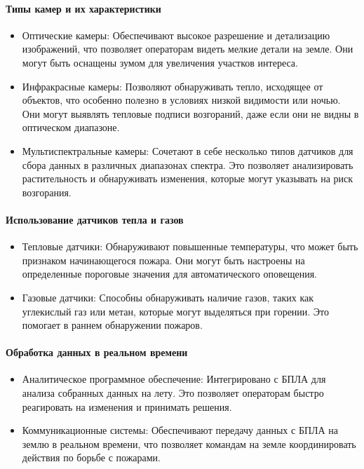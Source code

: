 \paragraph{Типы камер и их характеристики}
\begin{itemize}
	\item Оптические камеры: Обеспечивают высокое разрешение и детализацию изображений, что позволяет операторам видеть мелкие детали на земле. Они могут быть оснащены зумом для увеличения участков интереса.
	\item Инфракрасные камеры: Позволяют обнаруживать тепло, исходящее от объектов, что особенно полезно в условиях низкой видимости или ночью. Они могут выявлять тепловые подписи возгораний, даже если они не видны в оптическом диапазоне.
	\item Мультиспектральные камеры: Сочетают в себе несколько типов датчиков для сбора данных в различных диапазонах спектра. Это позволяет анализировать растительность и обнаруживать изменения, которые могут указывать на риск возгорания.
\end{itemize}
\paragraph{Использование датчиков тепла и газов}
\begin{itemize}
	\item Тепловые датчики: Обнаруживают повышенные температуры, что может быть признаком начинающегося пожара. Они могут быть настроены на определенные пороговые значения для автоматического оповещения.
	\item Газовые датчики: Способны обнаруживать наличие газов, таких как углекислый газ или метан, которые могут выделяться при горении. Это помогает в раннем обнаружении пожаров.
\end{itemize}
\paragraph{Обработка данных в реальном времени}
\begin{itemize}
	\item Аналитическое программное обеспечение: Интегрировано с БПЛА для анализа собранных данных на лету. Это позволяет операторам быстро реагировать на изменения и принимать решения.
	\item Коммуникационные системы: Обеспечивают передачу данных с БПЛА на землю в реальном времени, что позволяет командам на земле координировать действия по борьбе с пожарами.
\end{itemize}
